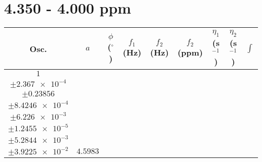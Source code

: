 \documentclass[8pt]{article}
\begin{document}
\section*{4.350 - 4.000 ppm}
\begin{longtable}[l]{c c c c c c c c c}
\toprule
Osc. & $a$ & $\phi$ ($^{\circ}$) & $f_1$ (Hz) & $f_2$ (Hz) & $f_2$ (ppm) & $\eta_1$ (s$^{-1}$) & $\eta_2$ (s$^{-1}$) & $\int$\\
\midrule
$\num{1}$ & \begin{tabular}[c]{@{}c@{}}$\num{5.6224e-2}$ \\ $\pm\num{2.367e-4}$\end{tabular} & \begin{tabular}[c]{@{}c@{}}$\num{-0.16174}$ \\ $\pm\num{0.23856}$\end{tabular} & \begin{tabular}[c]{@{}c@{}}$\num{-9.9663}$ \\ $\pm\num{8.4246e-4}$\end{tabular} & \begin{tabular}[c]{@{}c@{}}$\num{2.0213e+3}$ \\ $\pm\num{6.226e-3}$\end{tabular} & \begin{tabular}[c]{@{}c@{}}$\num{4.0438}$ \\ $\pm\num{1.2455e-5}$\end{tabular} & \begin{tabular}[c]{@{}c@{}}$\num{1.1816}$ \\ $\pm\num{5.2844e-3}$\end{tabular} & \begin{tabular}[c]{@{}c@{}}$\num{4.3923}$ \\ $\pm\num{3.9225e-2}$\end{tabular} & $\num{4.5983}$\\

\end{longtable}
\end{document}
